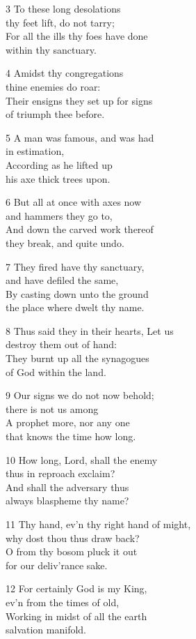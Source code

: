 3 To these long desolations\\
thy feet lift, do not tarry;\\
For all the ills thy foes have done\\
within thy sanctuary.

4 Amidst thy congregations\\
thine enemies do roar:\\
Their ensigns they set up for signs\\
of triumph thee before.

5 A man was famous, and was had\\
in estimation,\\
According as he lifted up\\
his axe thick trees upon.

6 But all at once with axes now\\
and hammers they go to,\\
And down the carved work thereof\\
they break, and quite undo.

7 They fired have thy sanctuary,\\
and have defiled the same,\\
By casting down unto the ground\\
the place where dwelt thy name.

8 Thus said they in their hearts, Let us\\
destroy them out of hand:\\
They burnt up all the synagogues\\
of God within the land.

9 Our signs we do not now behold;\\
there is not us among\\
A prophet more, nor any one\\
that knows the time how long.

10 How long, Lord, shall the enemy\\
thus in reproach exclaim?\\
And shall the adversary thus\\
always blaspheme thy name?

11 Thy hand, ev’n thy right hand of might,\\
why dost thou thus draw back?\\
O from thy bosom pluck it out\\
for our deliv’rance sake.

12 For certainly God is my King,\\
ev’n from the times of old,\\
Working in midst of all the earth\\
salvation manifold.

